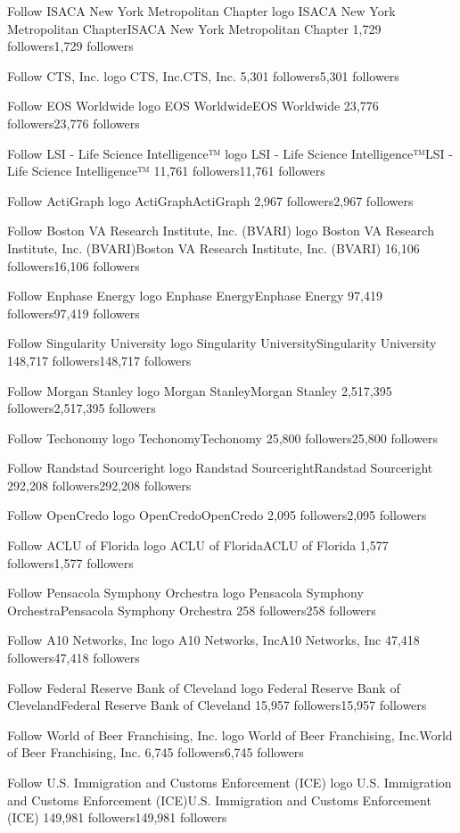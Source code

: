 Follow
ISACA New York Metropolitan Chapter logo
ISACA New York Metropolitan ChapterISACA New York Metropolitan Chapter
1,729 followers1,729 followers

Follow
CTS, Inc. logo
CTS, Inc.CTS, Inc.
5,301 followers5,301 followers

Follow
EOS Worldwide logo
EOS WorldwideEOS Worldwide
23,776 followers23,776 followers

Follow
LSI - Life Science Intelligence™ logo
LSI - Life Science Intelligence™LSI - Life Science Intelligence™
11,761 followers11,761 followers

Follow
ActiGraph logo
ActiGraphActiGraph
2,967 followers2,967 followers

Follow
Boston VA Research Institute, Inc. (BVARI) logo
Boston VA Research Institute, Inc. (BVARI)Boston VA Research Institute, Inc. (BVARI)
16,106 followers16,106 followers

Follow
Enphase Energy logo
Enphase EnergyEnphase Energy
97,419 followers97,419 followers

Follow
Singularity University logo
Singularity UniversitySingularity University
148,717 followers148,717 followers

Follow
Morgan Stanley logo
Morgan StanleyMorgan Stanley
2,517,395 followers2,517,395 followers

Follow
Techonomy logo
TechonomyTechonomy
25,800 followers25,800 followers

Follow
Randstad Sourceright logo
Randstad SourcerightRandstad Sourceright
292,208 followers292,208 followers

Follow
OpenCredo logo
OpenCredoOpenCredo
2,095 followers2,095 followers

Follow
ACLU of Florida logo
ACLU of FloridaACLU of Florida
1,577 followers1,577 followers

Follow
Pensacola Symphony Orchestra logo
Pensacola Symphony OrchestraPensacola Symphony Orchestra
258 followers258 followers

Follow
A10 Networks, Inc logo
A10 Networks, IncA10 Networks, Inc
47,418 followers47,418 followers

Follow
Federal Reserve Bank of Cleveland logo
Federal Reserve Bank of ClevelandFederal Reserve Bank of Cleveland
15,957 followers15,957 followers

Follow
World of Beer Franchising, Inc. logo
World of Beer Franchising, Inc.World of Beer Franchising, Inc.
6,745 followers6,745 followers

Follow
U.S. Immigration and Customs Enforcement (ICE) logo
U.S. Immigration and Customs Enforcement (ICE)U.S. Immigration and Customs Enforcement (ICE)
149,981 followers149,981 followers

